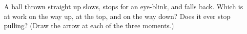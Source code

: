 \begin{exercise}[$\star\star$]\label{exo:g2:pushes-and-pulls:10}
A ball thrown straight up slows, stops for an eye-blink, and falls
back. Which  is at work on the way up, at the top, and on the
way down? Does it ever stop pulling? (Draw the arrow at each of the
three moments.)
\end{exercise}
